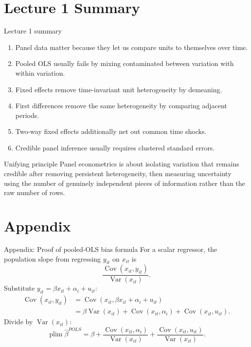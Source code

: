 \documentclass[10pt]{beamer}
\DeclareMathOperator{\Cov}{Cov}
\DeclareMathOperator{\Var}{Var}
\newcommand{\plim}{\operatorname*{plim}}
\begin{document}
\section{Lecture 1 Summary}

\begin{frame}{Lecture 1 summary}
\label{slide:summary}
\begin{enumerate}
  \item Panel data matter because they let us compare units to themselves over time.
  \item Pooled OLS usually fails by mixing contaminated between variation with within variation.
  \item Fixed effects remove time-invariant unit heterogeneity by demeaning.
  \item First differences remove the same heterogeneity by comparing adjacent periods.
  \item Two-way fixed effects additionally net out common time shocks.
  \item Credible panel inference usually requires clustered standard errors.
\end{enumerate}

\pause
\begin{alertblock}{Unifying principle}
Panel econometrics is about isolating variation that remains credible after removing persistent heterogeneity, then measuring uncertainty using the number of genuinely independent pieces of information rather than the raw number of rows.
\end{alertblock}
\end{frame}

\appendix

\section*{Appendix}

\begin{frame}{Appendix: Proof of pooled-OLS bias formula}
\label{app:poolsproof}
\small
For a scalar regressor, the population slope from regressing $y_{it}$ on $x_{it}$ is
\[
\frac{\Cov(x_{it}, y_{it})}{\Var(x_{it})}.
\]
Substitute $y_{it} = \beta x_{it} + \alpha_i + u_{it}$:
\begin{align*}
\Cov(x_{it}, y_{it})
&= \Cov(x_{it}, \beta x_{it} + \alpha_i + u_{it}) \\
&= \beta \Var(x_{it}) + \Cov(x_{it}, \alpha_i) + \Cov(x_{it}, u_{it}).
\end{align*}
Divide by $\Var(x_{it})$:
\[
\plim \hat{\beta}^{POLS}
=
\beta
+ \frac{\Cov(x_{it}, \alpha_i)}{\Var(x_{it})}
+ \frac{\Cov(x_{it}, u_{it})}{\Var(x_{it})}.
\]
\hfill\hyperlink{slide:poolsbias}{}
\end{frame}
\end{document}
